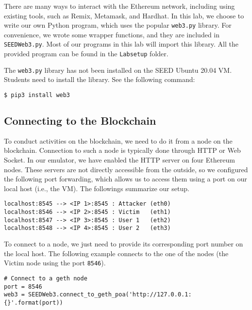 There are many ways to interact with the Ethereum network,
including using existing tools, such as Remix, Metamask, and Hardhat.
In this lab, we choose to write our own Python program, 
which uses the popular \texttt{web3.py} library. 
For convenience, we wrote some wrapper functions, and 
they are included in \texttt{SEEDWeb3.py}.  Most of our
programs in this lab will import this library. 
All the provided program can be found in the
\texttt{Labsetup} folder.  


The \texttt{web3.py} library has not been installed on the SEED Ubuntu 20.04 VM. 
Students need to install the library. See the following command:

\begin{lstlisting}
$ pip3 install web3
\end{lstlisting}





\subsection{Connecting to the Blockchain} 
\label{sec:sub:ports}

To conduct activities on the blockchain, we need to 
do it from a node on the blockchain. Connection to
such a node is typically done through HTTP or Web Socket. 
In our emulator, we have enabled the HTTP server on
four Ethereum nodes. These servers are not directly
accessible from the outside, so we configured
the following port forwarding, which allows us 
to access them using a port on our local host (i.e., the VM). 
The followings summarize our setup.

\begin{lstlisting}
localhost:8545 --> <IP 1>:8545 : Attacker (eth0)
localhost:8546 --> <IP 2>:8545 : Victim   (eth1)
localhost:8547 --> <IP 3>:8545 : User 1   (eth2)
localhost:8548 --> <IP 4>:8545 : User 2   (eth3)
\end{lstlisting}

To connect to a node, we just need to provide its corresponding
port number on the local host. The following example 
connects to the one of the nodes (the Victim node using the port \texttt{8546}). 

\begin{lstlisting}
# Connect to a geth node
port = 8546   
web3 = SEEDWeb3.connect_to_geth_poa('http://127.0.0.1:{}'.format(port))
\end{lstlisting}



